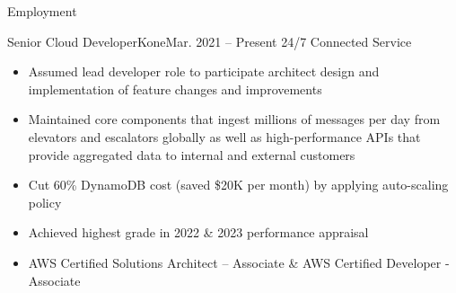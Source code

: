 \documentclass[print]{mcdowellcv}
\begin{document}
	\begin{cvsection}{Employment}
            \begin{cvsubsection}{Senior Cloud Developer}{Kone}{Mar. 2021 -- Present}
                24/7 Connected Service
                \begin{itemize}
                    \item Assumed lead developer role to participate architect design and implementation of feature changes and improvements
                    \item Maintained core components that ingest millions of messages per day from elevators and escalators globally as well as high-performance APIs that provide aggregated data to internal and external customers
                    \item Cut 60\% DynamoDB cost (saved \$20K per month) by applying auto-scaling policy
                    \item Achieved highest grade in 2022 \& 2023 performance appraisal
                    \item AWS Certified Solutions Architect – Associate \& AWS Certified Developer - Associate
                \end{itemize}
            \end{cvsubsection}
            

\end{cvsection}
\end{document}

